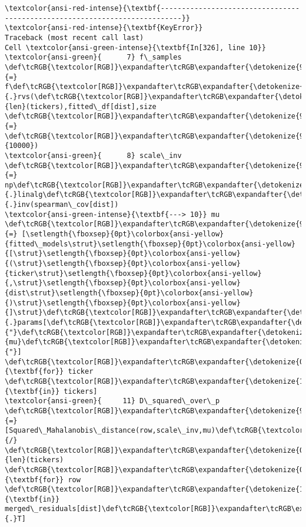 \documentclass[11pt]{article}
\begin{document}
    \begin{Verbatim}[commandchars=\\\{\}, frame=single, framerule=2mm, rulecolor=\color{outerrorbackground}]
\textcolor{ansi-red-intense}{\textbf{---------------------------------------------------------------------------}}
\textcolor{ansi-red-intense}{\textbf{KeyError}}                                  Traceback (most recent call last)
Cell \textcolor{ansi-green-intense}{\textbf{In[326], line 10}}
\textcolor{ansi-green}{      7} f\_samples \def\tcRGB{\textcolor[RGB]}\expandafter\tcRGB\expandafter{\detokenize{98,98,98}}{=} f\def\tcRGB{\textcolor[RGB]}\expandafter\tcRGB\expandafter{\detokenize{98,98,98}}{.}rvs(\def\tcRGB{\textcolor[RGB]}\expandafter\tcRGB\expandafter{\detokenize{0,135,0}}{len}(tickers),fitted\_df[dist],size \def\tcRGB{\textcolor[RGB]}\expandafter\tcRGB\expandafter{\detokenize{98,98,98}}{=} \def\tcRGB{\textcolor[RGB]}\expandafter\tcRGB\expandafter{\detokenize{98,98,98}}{10000})
\textcolor{ansi-green}{      8} scale\_inv \def\tcRGB{\textcolor[RGB]}\expandafter\tcRGB\expandafter{\detokenize{98,98,98}}{=} np\def\tcRGB{\textcolor[RGB]}\expandafter\tcRGB\expandafter{\detokenize{98,98,98}}{.}linalg\def\tcRGB{\textcolor[RGB]}\expandafter\tcRGB\expandafter{\detokenize{98,98,98}}{.}inv(spearman\_cov[dist])
\textcolor{ansi-green-intense}{\textbf{---> 10}} mu \def\tcRGB{\textcolor[RGB]}\expandafter\tcRGB\expandafter{\detokenize{98,98,98}}{=} [\setlength{\fboxsep}{0pt}\colorbox{ansi-yellow}{fitted\_models\strut}\setlength{\fboxsep}{0pt}\colorbox{ansi-yellow}{[\strut}\setlength{\fboxsep}{0pt}\colorbox{ansi-yellow}{(\strut}\setlength{\fboxsep}{0pt}\colorbox{ansi-yellow}{ticker\strut}\setlength{\fboxsep}{0pt}\colorbox{ansi-yellow}{,\strut}\setlength{\fboxsep}{0pt}\colorbox{ansi-yellow}{dist\strut}\setlength{\fboxsep}{0pt}\colorbox{ansi-yellow}{)\strut}\setlength{\fboxsep}{0pt}\colorbox{ansi-yellow}{]\strut}\def\tcRGB{\textcolor[RGB]}\expandafter\tcRGB\expandafter{\detokenize{98,98,98}}{.}params[\def\tcRGB{\textcolor[RGB]}\expandafter\tcRGB\expandafter{\detokenize{175,0,0}}{"}\def\tcRGB{\textcolor[RGB]}\expandafter\tcRGB\expandafter{\detokenize{175,0,0}}{mu}\def\tcRGB{\textcolor[RGB]}\expandafter\tcRGB\expandafter{\detokenize{175,0,0}}{"}] \def\tcRGB{\textcolor[RGB]}\expandafter\tcRGB\expandafter{\detokenize{0,135,0}}{\textbf{for}} ticker \def\tcRGB{\textcolor[RGB]}\expandafter\tcRGB\expandafter{\detokenize{175,0,255}}{\textbf{in}} tickers]
\textcolor{ansi-green}{     11} D\_squared\_over\_p \def\tcRGB{\textcolor[RGB]}\expandafter\tcRGB\expandafter{\detokenize{98,98,98}}{=} [Squared\_Mahalanobis\_distance(row,scale\_inv,mu)\def\tcRGB{\textcolor[RGB]}\expandafter\tcRGB\expandafter{\detokenize{98,98,98}}{/} \def\tcRGB{\textcolor[RGB]}\expandafter\tcRGB\expandafter{\detokenize{0,135,0}}{len}(tickers) \def\tcRGB{\textcolor[RGB]}\expandafter\tcRGB\expandafter{\detokenize{0,135,0}}{\textbf{for}} row \def\tcRGB{\textcolor[RGB]}\expandafter\tcRGB\expandafter{\detokenize{175,0,255}}{\textbf{in}} merged\_residuals[dist]\def\tcRGB{\textcolor[RGB]}\expandafter\tcRGB\expandafter{\detokenize{98,98,98}}{.}T] 

\end{Verbatim}
\end{document}
